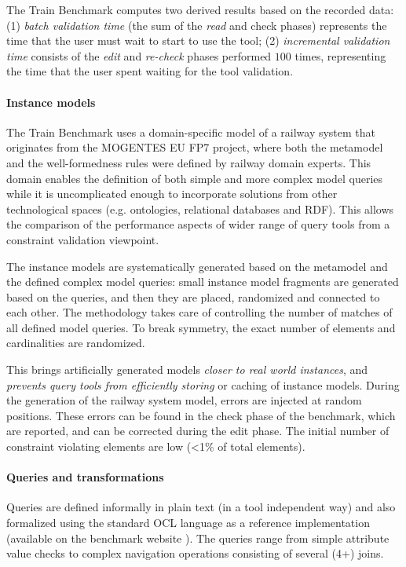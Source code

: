 The Train Benchmark computes two derived results based on the recorded data:
(1) \emph{batch validation time} (the sum of the \emph{read} and {check} phases)
represents the time that the user must wait to start to use the tool; (2)
\emph{incremental validation time} consists of the \emph{edit} and
\emph{re-check} phases performed $100$ times, representing the time that the
user spent waiting for the tool validation.


\paragraph{Instance models}
The Train Benchmark uses a domain-specific model of a railway system that
originates from the MOGENTES EU FP7 project, where both the metamodel and the
well-formedness rules were defined by railway domain experts. This domain
enables the definition of both simple and more complex model queries while it is
uncomplicated enough to incorporate solutions from other technological spaces
(e.g. ontologies, relational databases and RDF). This allows the comparison of
the performance aspects of wider range of query tools from a constraint
validation viewpoint.

The instance models are systematically generated based on the metamodel and the
defined complex model queries: small instance model fragments are generated
based on the queries, and then they are placed, randomized and connected to each
other. The methodology takes care of controlling the number of matches of all
defined model queries. To break symmetry, the exact number of elements and
cardinalities are randomized.
 
This brings artificially generated models \emph{closer to real world instances},
and \emph{prevents query tools from efficiently storing} or caching of instance
models. During the generation of the railway system model, errors are injected
at random positions. These errors can be found in the check phase of the
benchmark, which are reported, and can be corrected during the edit phase. The
initial number of constraint violating elements are low (<1\% of total
elements).
 
\paragraph{Queries and transformations}
Queries are defined informally in plain text (in a tool independent way) and
also formalized using the standard OCL language as a reference implementation
(available on the benchmark website \cite{TBwebsite}). The queries range from
simple attribute value checks to complex navigation operations consisting of
several (4+) joins.

